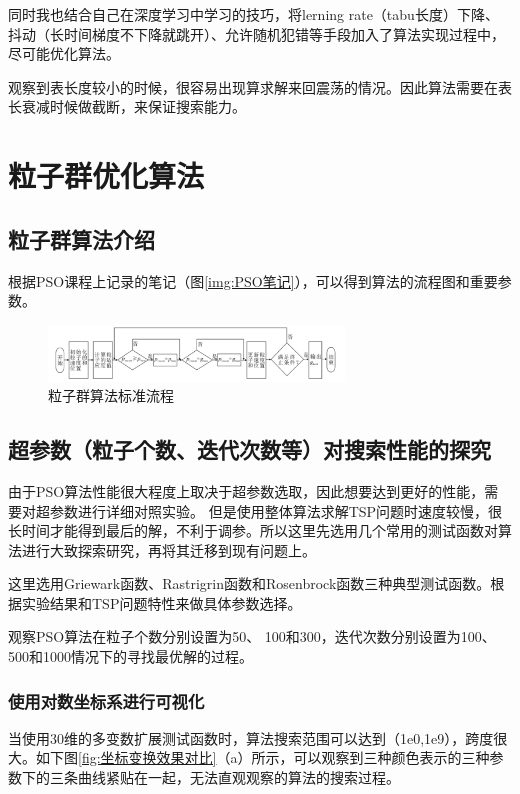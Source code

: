 \documentclass[lang=cn,11pt]{elegantpaper}
\begin{document}
同时我也结合自己在深度学习中学习的技巧，将lerning rate（tabu长度）下降、抖动（长时间梯度不下降就跳开）、允许随机犯错等手段加入了算法实现过程中，尽可能优化算法。

观察到表长度较小的时候，很容易出现算求解来回震荡的情况。因此算法需要在表长衰减时候做截断，来保证搜索能力。

\section{粒子群优化算法}
\subsection{粒子群算法介绍}


根据PSO课程上记录的笔记（图\ref{img:PSO笔记}），可以得到算法的流程图和重要参数。
\begin{figure}[h]
  \centering
  \includegraphics[width=0.7\textwidth]{figure/PSO/粒子群算法标准流程.png} %
  \caption{粒子群算法标准流程} %
  \label{img:粒子群算法标准流程}
\end{figure}
\subsection{超参数（粒子个数、迭代次数等）对搜索性能的探究}
由于PSO算法性能很大程度上取决于超参数选取，因此想要达到更好的性能，需要对超参数进行详细对照实验。
但是使用整体算法求解TSP问题时速度较慢，很长时间才能得到最后的解，不利于调参。所以这里先选用几个常用的测试函数对算法进行大致探索研究，再将其迁移到现有问题上。

这里选用Griewark函数、Rastrigrin函数和Rosenbrock函数三种典型测试函数。根据实验结果和TSP问题特性来做具体参数选择。

观察PSO算法在粒子个数分别设置为50、 100和300，迭代次数分别设置为100、 500和1000情况下的寻找最优解的过程。
\subsubsection{使用对数坐标系进行可视化}
当使用30维的多变数扩展测试函数时，算法搜索范围可以达到（1e0,1e9），跨度很大。如下图\ref{fig:坐标变换效果对比}（a）所示，可以观察到三种颜色表示的三种参数下的三条曲线紧贴在一起，无法直观观察的算法的搜索过程。
\end{document}
